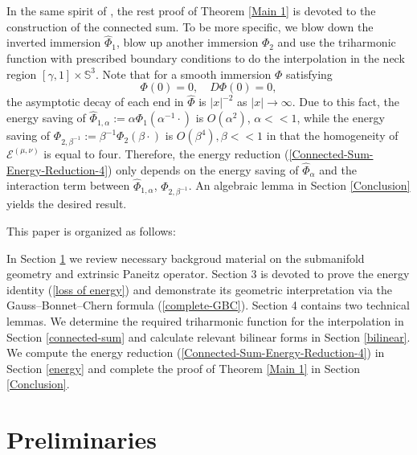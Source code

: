 \documentclass[11pt,letterpaper]{amsart}
\newcommand{\mE}{\mathcal{E}}
\newcommand{\bS}{\mathbb{S}}
\theoremstyle{definition}
\theoremstyle{remark}
\numberwithin{equation}{section}
\begin{document}
In the same spirit of \cite{Bauer-Kuwert03}, the rest proof of Theorem \ref{Main 1} is devoted to the construction of the connected sum. To be more specific, we blow down the inverted immersion $\hat{\Phi}_1$, blow up another immersion $\Phi_2$ and use the triharmonic function with prescribed boundary conditions to do the interpolation in the neck region $[\gamma, 1]\times \bS^3$. Note that for a smooth immersion $\Phi$ satisfying
\begin{equation*}
    \Phi(0)=0,\quad D\Phi(0)=0,
\end{equation*}
the asymptotic decay of each end in $\hat{\Phi}$ is $|x|^{-2}$ as $|x|\to \infty$. Due to this fact, the energy saving of $\hat{\Phi}_{1,\alpha}:=\alpha \Phi_1(\alpha^{-1}\cdot)$ is $O(\alpha^2)$, $\alpha<<1$, while the energy saving of $\Phi_{2,\beta^{-1}}:=\beta^{-1}\Phi_2(\beta\cdot)$ is $O(\beta^4), \beta<<1$ in that the homogeneity of $\mE^{(\mu,\nu)}$ is equal to four. Therefore, the energy reduction (\ref{Connected-Sum-Energy-Reduction-4}) only depends on the energy saving of $\hat{\Phi}_{\alpha}$ and the interaction term between $\hat{\Phi}_{1,\alpha}$, $\Phi_{2,\beta^{-1}}$. An algebraic lemma in Section \ref{Conclusion} yields the desired result.

This paper is organized as follows:

In Section \ref{preliminary} we review necessary backgroud material on the submanifold geometry and extrinsic Paneitz operator. Section 3 is devoted to prove the energy identity (\ref{loss of energy}) and demonstrate its geometric interpretation via the Gauss--Bonnet--Chern formula (\ref{complete-GBC}). Section 4 contains two technical lemmas. We determine the required triharmonic function for the interpolation in Section \ref{connected-sum} and calculate relevant bilinear forms in Section \ref{bilinear}. We compute the energy reduction (\ref{Connected-Sum-Energy-Reduction-4}) in Section \ref{energy} and complete the proof of Theorem \ref{Main 1} in Section \ref{Conclusion}.



\section{Preliminaries}\label{preliminary}
\end{document}
